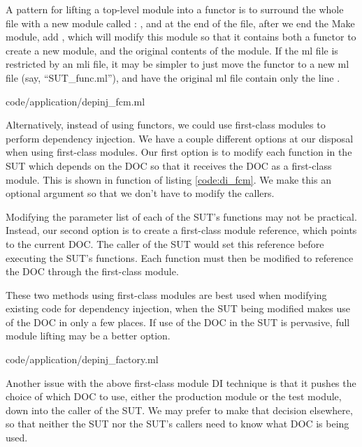 A pattern for lifting a top-level module into a functor is to surround
the whole file with a new module called :
, and at the end of the file,
after we end the Make module, add , which will
modify this module so that it contains both a functor to create a new
module, and the original contents of the module. If the ml file is
restricted by an mli file, it may be simpler to just move the functor
to a new ml file (say, ``SUT\_func.ml''), and have the original ml
file contain only the line .

 {code/application/depinj_fcm.ml}

Alternatively, instead of using functors, we could use first-class
modules to perform dependency injection. We have a couple different
options at our disposal when using first-class modules. Our first
option is to modify each function in the SUT which depends on the DOC
so that it receives the DOC as a first-class module. This is shown in
function  of listing \ref{code:di_fcm}. We make this an
optional argument so that we don't have to modify the callers.

Modifying the parameter list of each of the SUT's functions may not be
practical. Instead, our second option is to create a first-class
module reference, which points to the current DOC. The caller of the
SUT would set this reference before executing the SUT's
functions. Each function must then be modified to reference the DOC
through the first-class module.

These two methods using first-class modules are best used when
modifying existing code for dependency injection, when the SUT being
modified makes use of the DOC in only a few places. If use of the DOC
in the SUT is pervasive, full module lifting may be a better option.

 {code/application/depinj_factory.ml}

Another issue with the above first-class module DI technique is that
it pushes the choice of which DOC to use, either the production module
or the test module, down into the caller of the SUT. We may prefer to
make that decision elsewhere, so that neither the SUT nor the SUT's
callers need to know what DOC is being used.

